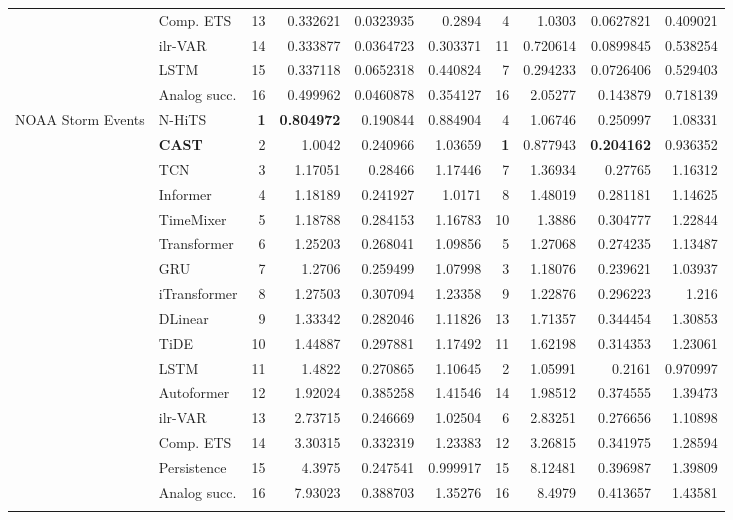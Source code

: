 \begin{longtable}{@{}llrrrrrrrr@{}}
 & Comp. ETS & 13 & 0.332621 & 0.0323935 & 0.2894 & 4 & 1.0303 & 0.0627821 & 0.409021 \\
 & ilr-VAR & 14 & 0.333877 & 0.0364723 & 0.303371 & 11 & 0.720614 & 0.0899845 & 0.538254 \\
 & LSTM & 15 & 0.337118 & 0.0652318 & 0.440824 & 7 & 0.294233 & 0.0726406 & 0.529403 \\
 & Analog succ. & 16 & 0.499962 & 0.0460878 & 0.354127 & 16 & 2.05277 & 0.143879 & 0.718139 \\
\addlinespace
NOAA Storm Events & N-HiTS & \textbf{1} & \textbf{0.804972} & 0.190844 & 0.884904 & 4 & 1.06746 & 0.250997 & 1.08331 \\
 & \textbf{CAST} & 2 & 1.0042 & 0.240966 & 1.03659 & \textbf{1} & 0.877943 & \textbf{0.204162} & 0.936352 \\
 & TCN & 3 & 1.17051 & 0.28466 & 1.17446 & 7 & 1.36934 & 0.27765 & 1.16312 \\
 & Informer & 4 & 1.18189 & 0.241927 & 1.0171 & 8 & 1.48019 & 0.281181 & 1.14625 \\
 & TimeMixer & 5 & 1.18788 & 0.284153 & 1.16783 & 10 & 1.3886 & 0.304777 & 1.22844 \\
 & Transformer & 6 & 1.25203 & 0.268041 & 1.09856 & 5 & 1.27068 & 0.274235 & 1.13487 \\
 & GRU & 7 & 1.2706 & 0.259499 & 1.07998 & 3 & 1.18076 & 0.239621 & 1.03937 \\
 & iTransformer & 8 & 1.27503 & 0.307094 & 1.23358 & 9 & 1.22876 & 0.296223 & 1.216 \\
 & DLinear & 9 & 1.33342 & 0.282046 & 1.11826 & 13 & 1.71357 & 0.344454 & 1.30853 \\
 & TiDE & 10 & 1.44887 & 0.297881 & 1.17492 & 11 & 1.62198 & 0.314353 & 1.23061 \\
 & LSTM & 11 & 1.4822 & 0.270865 & 1.10645 & 2 & 1.05991 & 0.2161 & 0.970997 \\
 & Autoformer & 12 & 1.92024 & 0.385258 & 1.41546 & 14 & 1.98512 & 0.374555 & 1.39473 \\
 & ilr-VAR & 13 & 2.73715 & 0.246669 & 1.02504 & 6 & 2.83251 & 0.276656 & 1.10898 \\
 & Comp. ETS & 14 & 3.30315 & 0.332319 & 1.23383 & 12 & 3.26815 & 0.341975 & 1.28594 \\
 & Persistence & 15 & 4.3975 & 0.247541 & 0.999917 & 15 & 8.12481 & 0.396987 & 1.39809 \\
 & Analog succ. & 16 & 7.93023 & 0.388703 & 1.35276 & 16 & 8.4979 & 0.413657 & 1.43581 \\
\addlinespace

\end{longtable}
